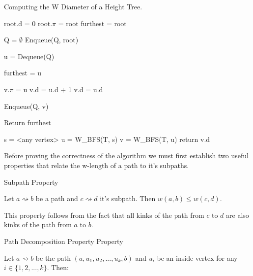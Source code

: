 \begin{algorithm}
\caption{Computing the W Diameter of a Height Tree.}

\begin{algorithmic}[1]

    \State root.d = 0
    \State root.$\pi$ = root
    \State furthest = root

    \State Q = $\emptyset$
    \State Enqueue(Q, root)

        \State u = Dequeue(Q)

            \State furthest = u
        \EndIf

                \State v.$\pi$ = u
                    \State v.d = u.d + 1
                \Else
                    \State v.d = u.d
                \EndIf

                \State Enqueue(Q, v)

            \EndIf
        \EndFor
    \EndWhile
    \State Return furthest
\EndFunction

    \State s = <any vertex>
    \State u = W\_BFS(T, s)
    \State v = W\_BFS(T, u)
    \State return v.d
\EndFunction

\end{algorithmic}
\end{algorithm}

Before proving the correctness of the algorithm we must first establish two useful properties that relate the w-length of a path to it's subpaths.

\begin{defn} Subpath Property  \end{defn}

Let $a \rightsquigarrow b$ be a path and $c \rightsquigarrow d$ it's subpath. Then $w(a, b) \le w(c, d)$. 

This property follows from the fact that all kinks of the path from $c$ to $d$ are also kinks of the path from $a$ to $b$.

\begin{defn} Path Decomposition Property Property  \end{defn}

    Let $a \rightsquigarrow b$ be the path $(a, u_1, u_2, ..., u_k, b)$ and $u_i$ be an inside vertex for any $i \in \{1, 2, ..., k\}$. Then: 
    

